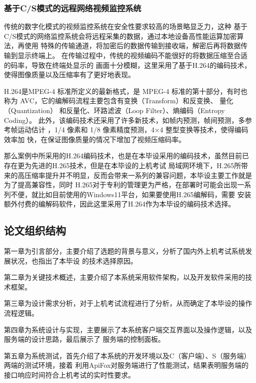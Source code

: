 \subsubsection{基于C/S模式的远程网络视频监控系统}

传统的数字化模式的视频监控系统在安全性要求较高的场景略显乏力，这种
基于C/S模式的网络监控系统会将远程采集的数据，通过本地设备高性能运算加密算法，再使用
特殊的传输通道，将加密后的数据传输到接收端，解密后再将数据传输到显示终端上\cite{Liu2022}。
在传输过程中，传统的视频编码不能很好的将数据压缩至合适的码率，导致在终端处显示的
画面十分模糊，这里采用了基于H.264的编码技术，使得图像质量以及压缩率有了更好地表现。
	
H.264是MPEG-4 标准所定义的最新格式，是 MPEG-4 标准的第十部分，有时也称为 
AVC\cite{Ao2012}，它的编解码流程主要包含有变换（Transform）和反变换、 量化（Quantization） 
和反量化、环路滤波（Loop Filter）、熵编码（Entropy Coding）\cite{Marpe2006}。
此外，该编码技术还采用了许多新技术，如帧内预测\cite{Pei2005}，帧间预测\cite{Song2007}，多参考帧运动估计
\cite{1626282}，1/4 像素和 1/8 像素精度预测\cite{1341708}，4×4 整型变换等技术\cite{1218192}，使得编码效率加
快，在保证图像质量的情况下增加了视频压缩码率。

那么案例中所采用的H.264编码技术，也是在本毕设采用的编码技术，虽然目前已存在更为先进的H.265技术，但是在本毕设的上机考试
局域网环境下，H.265所带来的高压缩率提升并不明显，反而会带来一系列的兼容问题，本毕设主要工作就是为了提高兼容性，同时
H.265对于专利的管理更为严格，在部署时可能会出现一系列不便，就比如目前使用的Windows11平台，如果要使用H.265编解码，需要
安装额外付费的编解码软件，因此这里采用了H.264作为本毕设的编码技术选择。

\newpage

\subsection{论文组织结构}

第一章为引言部分，主要介绍了选题的背景与意义，分析了国内外上机考试系统发展状况，也指出了本毕设
的技术选择原因。

第二章为关键技术概述，主要介绍了本系统采用软件架构，以及开发软件采用的技术框架。

第三章为设计需求分析，对于上机考试流程进行了分析，从而确定了本毕设的操作流程逻辑。

第四章为系统设计与实现，主要展示了本系统客户端交互界面以及操作逻辑，以及服务端的设计思路，最后展示了
服务端的控制面板。

第五章为系统测试，首先介绍了本系统的开发环境以及C（客户端）、S（服务端）两端的测试环境，接着
利用ApiFox对服务端进行了性能测试，结果表明服务端的接口响应时间符合上机考试的实时性要求。

